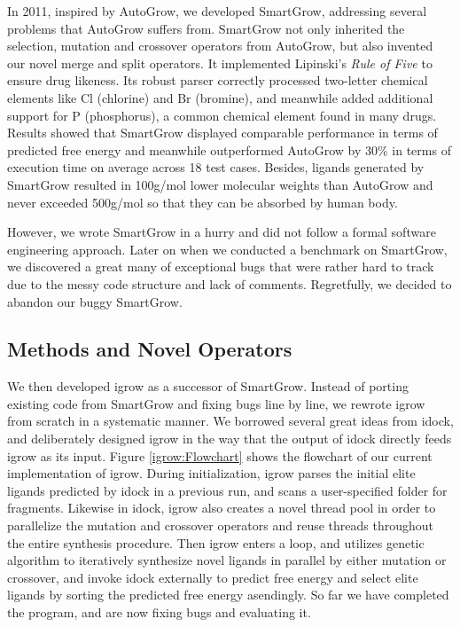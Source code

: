 In 2011, inspired by AutoGrow, we developed SmartGrow, addressing several problems that AutoGrow suffers from. SmartGrow not only inherited the selection, mutation and crossover operators from AutoGrow, but also invented our novel merge and split operators. It implemented Lipinski's \textit{Rule of Five} \citep{168} to ensure drug likeness. Its robust parser correctly processed two-letter chemical elements like Cl (chlorine) and Br (bromine), and meanwhile added additional support for P (phosphorus), a common chemical element found in many drugs. Results showed that SmartGrow displayed comparable performance in terms of predicted free energy and meanwhile outperformed AutoGrow by 30\% in terms of execution time on average across 18 test cases. Besides, ligands generated by SmartGrow resulted in 100g/mol lower molecular weights than AutoGrow and never exceeded 500g/mol so that they can be absorbed by human body.

However, we wrote SmartGrow in a hurry and did not follow a formal software engineering approach. Later on when we conducted a benchmark on SmartGrow, we discovered a great many of exceptional bugs that were rather hard to track due to the messy code structure and lack of comments. Regretfully, we decided to abandon our buggy SmartGrow.

\subsection{Methods and Novel Operators}

We then developed igrow as a successor of SmartGrow. Instead of porting existing code from SmartGrow and fixing bugs line by line, we rewrote igrow from scratch in a systematic manner. We borrowed several great ideas from idock, and deliberately designed igrow in the way that the output of idock directly feeds igrow as its input. Figure \ref{igrow:Flowchart} shows the flowchart of our current implementation of igrow. During initialization, igrow parses the initial elite ligands predicted by idock in a previous run, and scans a user-specified folder for fragments. Likewise in idock, igrow also creates a novel thread pool in order to parallelize the mutation and crossover operators and reuse threads throughout the entire synthesis procedure. Then igrow enters a loop, and utilizes genetic algorithm to iteratively synthesize novel ligands in parallel by either mutation or crossover, and invoke idock externally to predict free energy and select elite ligands by sorting the predicted free energy asendingly. So far we have completed the program, and are now fixing bugs and evaluating it.

